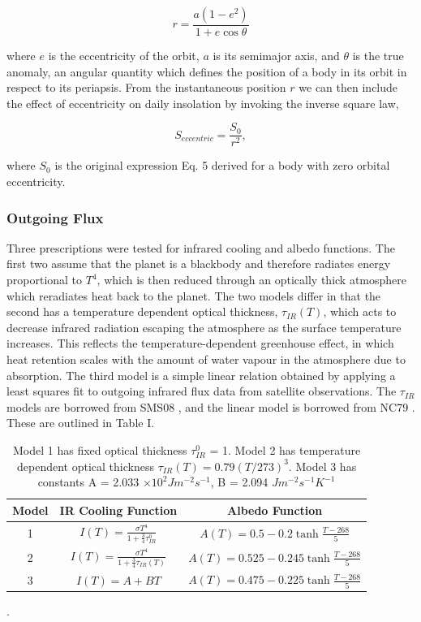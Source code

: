 \documentclass[12pt,onecolumn]{revtex4-2}    %
\begin{document}
\begin{equation}
r = \frac{a(1-e^{2})}{1 + e \cos \theta}
\end{equation}

where $e$ is the eccentricity of the orbit, $a$ is its semimajor axis, and $\theta$ is the true anomaly, an angular quantity which defines the position of a body in its orbit in respect to its periapsis. From the instantaneous position $r$ we can then include the effect of eccentricity on daily insolation by invoking the inverse square law,

\begin{equation}
S_{eccentric} = \frac{S_{0}}{r^{2}},
\end{equation}

where $S_{0}$ is the original expression Eq. 5 derived for a body with zero orbital eccentricity.

\subsubsection{Outgoing Flux}
Three prescriptions were tested for infrared cooling and albedo functions. The first two assume that the planet is a blackbody and therefore radiates energy proportional to $T^{4}$, which is then reduced through an optically thick atmosphere which reradiates heat back to the planet. The two models differ in that the second has a temperature dependent optical thickness, $\tau_{IR}(T)$, which acts to decrease infrared radiation escaping the atmosphere as the surface temperature increases. This reflects the temperature-dependent greenhouse effect, in which heat retention scales with the amount of water vapour in the atmosphere due to absorption. The third model is a simple linear relation obtained by applying a least squares fit to outgoing infrared flux data from satellite observations. The $\tau_{IR}$ models are borrowed from SMS08 \cite{SMS08}, and the linear model is borrowed from NC79 \cite{NC79}. These are outlined in Table I. 
\\
\begin{table}
\begin{tabular}{ccc} \toprule
    Model & IR Cooling Function & Albedo Function \\ \midrule
    1  & $I(T) = \frac{\sigma T^{4}}{1+ \frac{3}{4}\tau_{IR}^{0}}$ & $A(T) = 0.5 - 0.2 \tanh \frac{T - 268}{5}$ \\
    2  & $I(T) = \frac{\sigma T^{4}}{1+ \frac{3}{4}\tau_{IR}(T)}$  & $A(T) = 0.525 - 0.245 \tanh \frac{T - 268}{5}$ \\
    3  & $I(T) = A + BT $  & $A(T) = 0.475 - 0.225 \tanh \frac{T - 268}{5}$ \\
\bottomrule
\end{tabular}
\caption{Model 1 has fixed optical thickness $\tau_{IR}^{0}$ = 1. Model 2 has temperature dependent optical thickness $\tau_{IR}(T) = 0.79(T/273)^{3}$. Model 3 has constants A = 2.033 $\times 10^{2} Jm^{-2}s^{-1}$, B = 2.094 $J m^{-2} s^{-1} K^{-1}$}.
\end{table}
\end{document}
